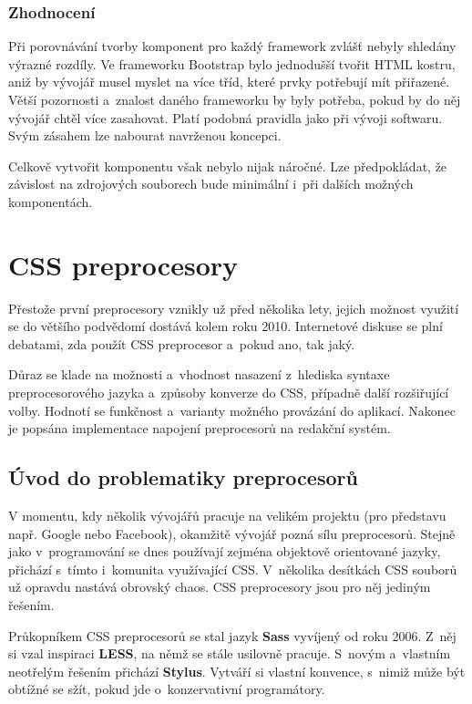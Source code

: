 \documentclass[thesis=B,czech]{FITthesis}[2012/06/26]
\begin{document}
\subsection{Zhodnocení}
Při porovnávání tvorby komponent pro každý framework zvlášť nebyly shledány výrazné rozdíly. Ve frameworku Bootstrap bylo jednodušší tvořit \gls{HTML} kostru, aniž by vývojář musel myslet na více tříd, které prvky potřebují mít přiřazené. Větší pozornosti a~znalost daného frameworku by byly potřeba, pokud by do něj vývojář chtěl více zasahovat. Platí podobná pravidla jako při vývoji softwaru. Svým zásahem lze nabourat navrženou koncepci.

Celkově vytvořit komponentu však nebylo nijak náročné. Lze předpokládat, že závislost na zdrojových souborech bude minimální i~při dalších možných komponentách.


\chapter{CSS preprocesory}
Přestože první preprocesory vznikly už před několika lety, jejich možnost využití se do většího podvědomí dostává kolem roku 2010. Internetové diskuse se plní debatami, zda použít \gls{CSS} preprocesor a~pokud ano, tak jaký. 

Důraz se klade na možnosti a~vhodnost nasazení z~hlediska syntaxe preprocesorového jazyka a~způsoby konverze do \gls{CSS}, případně další rozšiřující volby. Hodnotí se funkčnost a~varianty možného provázání do aplikací. Nakonec je popsána implementace napojení preprocesorů na redakční systém.


\section{Úvod do problematiky preprocesorů}


V momentu, kdy několik vývojářů pracuje na velikém projektu (pro představu např. Google nebo Facebook), okamžitě vývojář pozná sílu preprocesorů. Stejně jako v~programování se dnes používají zejména objektově orientované jazyky, přichází s~tímto i~komunita využívající \gls{CSS}. V~několika desítkách \gls{CSS} souborů už opravdu nastává obrovský chaos. \gls{CSS} preprocesory jsou pro něj jediným řešením.

Průkopníkem \gls{CSS} preprocesorů se stal jazyk \textbf{\gls{Sass}} vyvíjený od roku 2006. Z~něj si vzal inspiraci \textbf{LESS}, na němž se stále usilovně pracuje. S~novým a~vlastním neotřelým řešením přichází \textbf{Stylus}. Vytváří si vlastní konvence, s~nimiž může být obtížné se sžít, pokud jde o~konzervativní programátory. 
\end{document}
